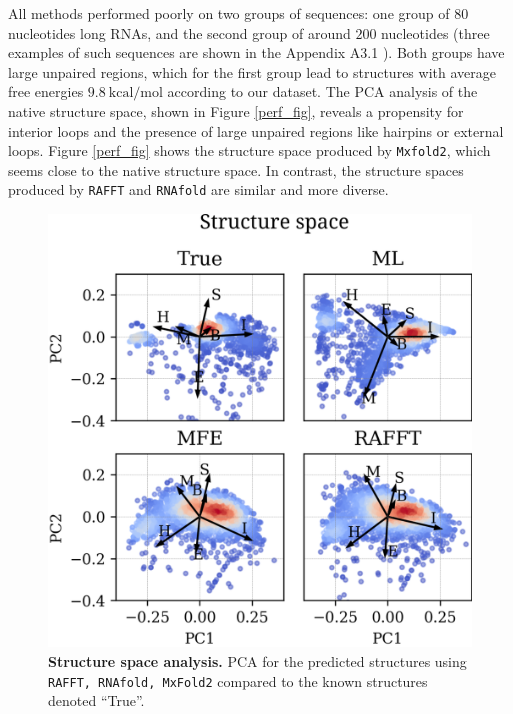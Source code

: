 All methods performed poorly on two groups of sequences: one group of $80$ nucleotides long RNAs, and the second group of around $200$ nucleotides (three examples of such sequences are shown in the Appendix A3.1 ). Both groups have large unpaired regions, which for the first group lead to structures with average free energies $9.8\ \textrm{kcal/mol}$ according to our dataset. The PCA analysis of the native structure space, shown in Figure \ref{perf_fig}, reveals a propensity for interior loops and the presence of large unpaired regions like hairpins or external loops. Figure \ref{perf_fig} shows the structure space produced by \texttt{Mxfold2}, which seems close to the native structure space. In contrast, the structure spaces produced by \texttt{RAFFT} and \texttt{RNAfold} are similar and more diverse.
\begin{figure}[t!]
	\centering
	\includegraphics[width=.9\linewidth]{../res/images/rafft/perf_pca.png}
	\caption{\label{perf_pca} \textbf{Structure space analysis.} PCA for the
		predicted structures using \texttt{RAFFT, RNAfold, MxFold2} compared to the
		known structures denoted ``True''.}
\end{figure}
